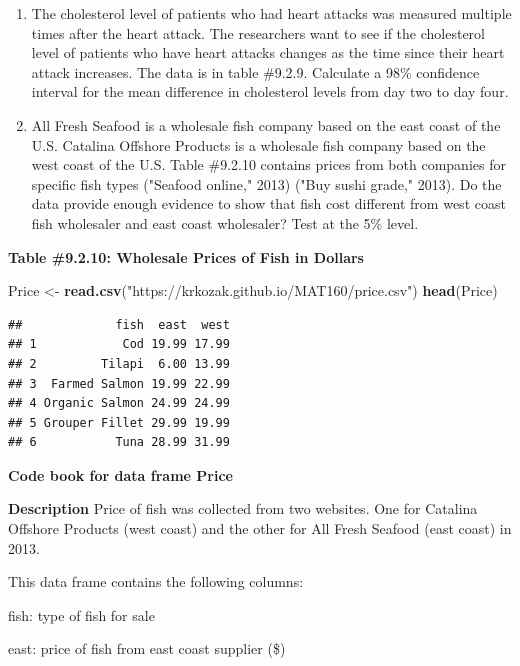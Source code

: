 \documentclass[
]{book}
\newenvironment{Shaded}{\begin{snugshade}}{\end{snugshade}}
\newcommand{\KeywordTok}[1]{\textcolor[rgb]{0.13,0.29,0.53}{\textbf{#1}}}
\newcommand{\NormalTok}[1]{#1}
\newcommand{\StringTok}[1]{\textcolor[rgb]{0.31,0.60,0.02}{#1}}
\begin{document}
\begin{enumerate}
\def\labelenumi{\arabic{enumi}.}
\setcounter{enumi}{1}
\item
  The cholesterol level of patients who had heart attacks was measured multiple times after the heart attack. The researchers want to see if the cholesterol level of patients who have heart attacks changes as the time since their heart attack increases. The data is in table \#9.2.9. Calculate a 98\% confidence interval for the mean difference in cholesterol levels from day two to day four.
\item
  All Fresh Seafood is a wholesale fish company based on the east coast of the U.S. Catalina Offshore Products is a wholesale fish company based on the west coast of the U.S. Table \#9.2.10 contains prices from both companies for specific fish types ("Seafood online," 2013) ("Buy sushi grade," 2013). Do the data provide enough evidence to show that fish cost different from west coast fish wholesaler and east coast wholesaler? Test at the 5\% level.
\end{enumerate}

\textbf{Table \#9.2.10: Wholesale Prices of Fish in Dollars}

\begin{Shaded}
\begin{Highlighting}[]
\NormalTok{ Price <-}\StringTok{ }\KeywordTok{read.csv}\NormalTok{(}\StringTok{"https://krkozak.github.io/MAT160/price.csv"}\NormalTok{)}
\KeywordTok{head}\NormalTok{(Price)}
\end{Highlighting}
\end{Shaded}

\begin{verbatim}
##             fish  east  west
## 1            Cod 19.99 17.99
## 2         Tilapi  6.00 13.99
## 3  Farmed Salmon 19.99 22.99
## 4 Organic Salmon 24.99 24.99
## 5 Grouper Fillet 29.99 19.99
## 6           Tuna 28.99 31.99
\end{verbatim}

\textbf{Code book for data frame Price}

\textbf{Description}
Price of fish was collected from two websites. One for Catalina Offshore Products (west coast) and the other for All Fresh Seafood (east coast) in 2013.

This data frame contains the following columns:

fish: type of fish for sale

east: price of fish from east coast supplier (\$)
\end{document}
